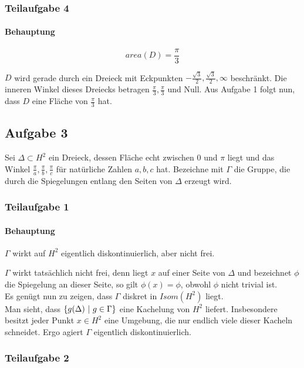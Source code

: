 \documentclass{book}
\begin{document}
\subsubsection{Teilaufgabe 4}
\paragraph{Behauptung}
\[ area(D) = \frac{\pi}{3} \]
\begin{Beweis}{}
	$D$ wird gerade durch ein Dreieck mit Eckpunkten $-\frac{\sqrt{3}}{2},  \frac{\sqrt{3}}{2}, \infty$ beschränkt. Die inneren Winkel dieses Dreiecks betragen $\frac{\pi}{3},\frac{\pi}{3}$ und Null. Aus Aufgabe 1 folgt nun, dass $D$ eine Fläche von $\frac{\pi}{3}$ hat.
\end{Beweis}

\subsection{Aufgabe 3}
Sei $\Delta \subset H^2$ ein Dreieck, dessen Fläche echt zwischen 0 und $\pi$ liegt und das Winkel $\frac{\pi}{a}, \frac{\pi}{b}, \frac{\pi}{c}$ für natürliche Zahlen $a,b,c$ hat. Bezeichne mit $\Gamma$ die Gruppe, die durch die Spiegelungen entlang den Seiten von $\Delta$ erzeugt wird.
\subsubsection{Teilaufgabe 1}
\paragraph{Behauptung}
$\Gamma$ wirkt auf $H^2$ eigentlich diskontinuierlich, aber nicht frei.
\begin{Beweis}{}
	$\Gamma$ wirkt tatsächlich nicht frei, denn liegt $x$ auf einer Seite von $\Delta$ und bezeichnet $\phi$ die Spiegelung an dieser Seite, so gilt $\phi(x) = \phi$, obwohl $\phi$ nicht trivial ist.\\
	Es genügt nun zu zeigen, dass $\Gamma$ diskret in $Isom(H^2)$ liegt.\\
Man sieht, dass $\set{g(\Delta)}{g \in \Gamma}$ eine Kachelung von $H^2$ liefert. Insbesondere besitzt jeder Punkt $x\in H^2$ eine Umgebung, die nur endlich viele dieser Kacheln schneidet. Ergo agiert $\Gamma$ eigentlich diskontinuierlich.
\end{Beweis}
\subsubsection{Teilaufgabe 2}
\end{document}
